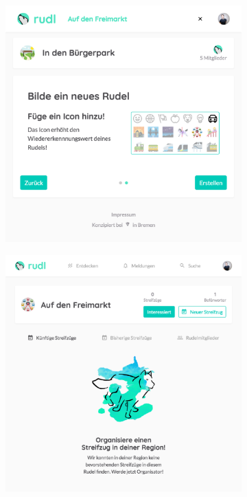 \documentclass[12pt,numbers=noenddot,parskip,bibliography=totocnumbered,listof=totocnumbered,draft]{scrreprt}
\begin{document}
\begin{figure}
\begin{subfigure}[t]{0.45\textwidth}%
\centering
\includegraphics[width=\linewidth]{createinterestgroup1.png}
\caption{}
\label{createinterestgroup1}
\end{subfigure}%
\hfill
\begin{subfigure}[t]{0.45\textwidth}%
\centering
\includegraphics[width=\linewidth]{interestgroup.png}

\end{subfigure}
\end{figure}
\end{document}
